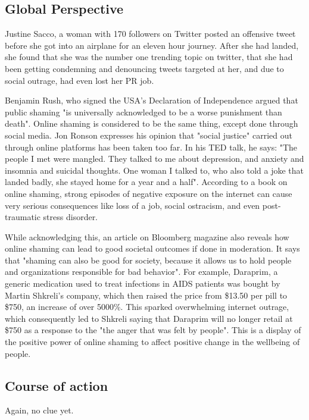 \documentclass[a4paper, 11pt]{article}
\begin{document}
  \subsection{Global Perspective}
    Justine Sacco, a woman with 170 followers on Twitter posted an offensive tweet before she got into an airplane for an eleven hour journey. After she had landed, she found that she was the number one trending topic on twitter, that she had been getting condemning and denouncing tweets targeted at her, and due to social outrage, had even lost her PR job.

    Benjamin Rush, who signed the USA's Declaration of Independence argued that public shaming "is universally acknowledged to be a worse punishment than death". Online shaming is considered to be the same thing, except done through social media. Jon Ronson expresses his opinion that "social justice" carried out through online platforms has been taken too far. In his TED talk, he says: "The people I met were mangled. They talked to me about depression, and anxiety and insomnia and suicidal thoughts. One woman I talked to, who also told a joke that landed badly, she stayed home for a year and a half".\cite{jon-ronson-ted-talk} According to a book on online shaming, strong episodes of negative exposure on the internet can cause very serious consequences like loss of a job, social ostracism, and even post-traumatic stress disorder.\cite{shame-nation-book}

    While acknowledging this, an article on Bloomberg magazine also reveals how online shaming can lead to good societal outcomes if done in moderation.\cite{bloomberg-online-shaming} It says that "shaming can also be good for society, because it allows us to hold people and organizations responsible for bad behavior". For example, Daraprim, a generic medication used to treat infections in AIDS patients was bought by Martin Shkreli's company, which then raised the price from \$13.50 per pill to \$750, an increase of over 5000\%.\cite{washington-martin} This sparked overwhelming internet outrage, which consequently led to Shkreli saying that Daraprim will no longer retail at \$750 as a response to the "the anger that was felt by people". This is a display of the positive power of online shaming to affect positive change in the wellbeing of people.

  \subsection{Course of action}
    Again, no clue yet.
\end{document}
